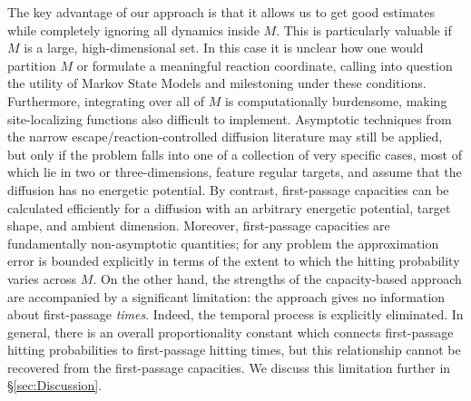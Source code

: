 \documentclass[12pt, nofootinbib,english, amsmath, amssymb, aps, priprint, graphicx,floatfix]{revtex4-1}
\theoremstyle{plain}
\theoremstyle{definition}
\theoremstyle{plain}
\begin{document}
The key advantage of our approach is that it allows us to get good estimates while completely ignoring all dynamics inside $M$.  This is particularly valuable if $M$ is a large, high-dimensional set.  In this case it is unclear how one would partition $M$ or formulate a meaningful reaction coordinate, calling into question the utility of Markov State Models and milestoning under these conditions.  Furthermore, integrating over all of $M$ is computationally burdensome, making site-localizing functions also difficult to implement.  Asymptotic techniques from the narrow escape/reaction-controlled diffusion literature may still be applied, but only if the problem falls into one of a collection of very specific cases, most of which lie in two or three-dimensions, feature regular targets, and assume that the diffusion has no energetic potential.  By contrast, 
first-passage capacities can be calculated efficiently for a diffusion with an arbitrary energetic potential, target shape, and ambient dimension.  Moreover, first-passage capacities are fundamentally non-asymptotic quantities; for any problem the approximation error is bounded explicitly in terms of the extent to which the hitting probability varies across $M$.  On the other hand,
the strengths of the capacity-based approach are accompanied by a significant limitation: the approach gives no information about first-passage {\em times}. Indeed, the temporal process is explicitly eliminated. In general, there is an overall proportionality constant which connects first-passage hitting probabilities to first-passage hitting times, but this relationship cannot be recovered from the first-passage capacities.  We discuss this limitation further in \S\ref{sec:Discussion}.
 
\end{document}
